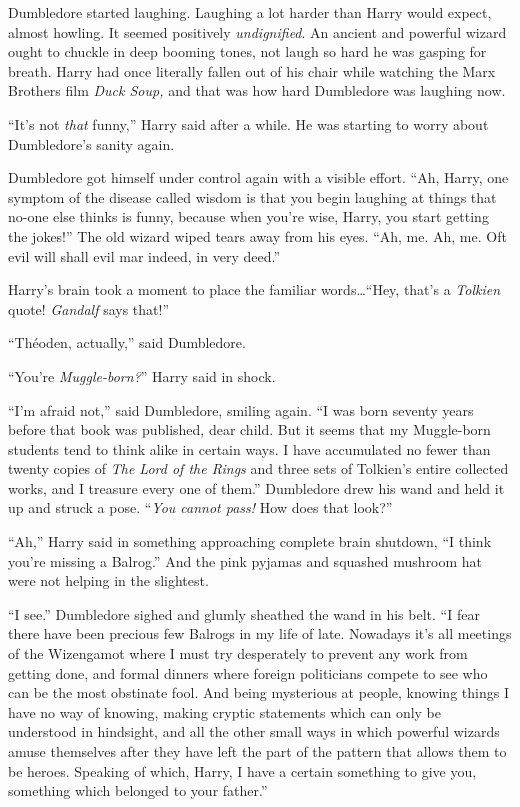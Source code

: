 Dumbledore started laughing. Laughing a lot harder than Harry would expect, almost howling. It seemed positively \emph{undignified}. An ancient and powerful wizard ought to chuckle in deep booming tones, not laugh so hard he was gasping for breath. Harry had once literally fallen out of his chair while watching the Marx Brothers film \emph{Duck Soup,} and that was how hard Dumbledore was laughing now.

“It’s not \emph{that} funny,” Harry said after a while. He was starting to worry about Dumbledore’s sanity again.

Dumbledore got himself under control again with a visible effort.
“Ah, Harry, one symptom of the disease called wisdom is that you begin laughing at things that no-one else thinks is funny, because when you’re wise, Harry, you start getting the jokes!” The old wizard wiped tears away from his eyes.
“Ah, me. Ah, me. Oft evil will shall evil mar indeed, in very deed.”

Harry’s brain took a moment to place the familiar words…“Hey, that’s a \emph{Tolkien} quote! \emph{Gandalf} says that!”

“Théoden, actually,” said Dumbledore.

“You’re \emph{Muggle-born?}” Harry said in shock.

“I’m afraid not,” said Dumbledore, smiling again.
“I was born seventy years before that book was published, dear child. But it seems that my Muggle-born students tend to think alike in certain ways. I have accumulated no fewer than twenty copies of \emph{The Lord of the Rings} and three sets of Tolkien’s entire collected works, and I treasure every one of them.” Dumbledore drew his wand and held it up and struck a pose. “\emph{You cannot pass!} How does that look?”

“Ah,” Harry said in something approaching complete brain shutdown,
“I think you’re missing a Balrog.” And the pink pyjamas and squashed mushroom hat were not helping in the slightest.

“I see.” Dumbledore sighed and glumly sheathed the wand in his belt.
“I fear there have been precious few Balrogs in my life of late. Nowadays it’s all meetings of the Wizengamot where I must try desperately to prevent any work from getting done, and formal dinners where foreign politicians compete to see who can be the most obstinate fool. And being mysterious at people, knowing things I have no way of knowing, making cryptic statements which can only be understood in hindsight, and all the other small ways in which powerful wizards amuse themselves after they have left the part of the pattern that allows them to be heroes. Speaking of which, Harry, I have a certain something to give you, something which belonged to your father.”

